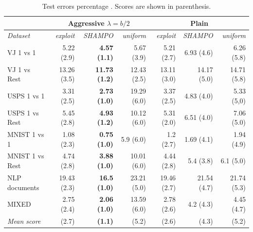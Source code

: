 \begin{table}[h] 
\begin{centering}
\caption{Test errors percentage . Scores are shown in parenthesis.}
\label{tab:table1}
{\scriptsize	
\begin{tabular}{|l|r|r|r|r|r|r|}
\hline
                         & \multicolumn{3}{c|}{\textbf{Aggressive $\lambda=b/2$}}               & \multicolumn{3}{c|}{\textbf{Plain}}                 \\ \hline
\textit{Dataset}         & \textit{exploit} & \textit{SHAMPO}         & \textit{uniform} & \textit{exploit} & \textit{SHAMPO} & \textit{uniform} \\ \hline
{VJ 1 vs 1 }        & 5.22 (2.9)       & \textbf{4.57 (1.1)}   & 5.67 (3.9)       & 5.21 (2.7)       & 6.93 (4.6)    & 6.26 (5.8)       \\
\textrm{VJ 1 vs Rest}    & 13.26 (3.5)      & \textbf{11.73 (1.2)} & 12.43 (2.5)      & 13.11 (3.0)        & 14.17 (5.0)     & 14.71 (5.8)     \\
\textrm{USPS 1 vs 1}      & 3.31 (2.5)       & \textbf{2.73 (1.0)}     & 19.29 (6.0)        & 3.37 (2.5)       & 4.83 (4.0)      & 5.33 (5,0)         \\
\textrm{USPS 1 vs Rest}  & 5.45 (2.8)      & \textbf{4.93 (1.2)}  & 10.12 (6.0)        & 5.31 (2.0)         & 6.51 (4.0)      & 7.06 (5.0)         \\
\textrm{MNIST 1 vs 1}     & 1.08 (2.3)       & \textbf{0.75 (1.0)}     & 5.9 (6.0)         & 1.2 (2.7)       & 1.69 (4.1)      & 1.94 (4.9)     \\
\textrm{MNIST 1 vs Rest} & 4.74 (2.8)      & \textbf{3.88 (1.0)}     & 10.01 (6.0)       & 4.44 (2.8)      & 5.4 (3.8)    & 6.1 (5.0)          \\
\textrm{NLP documents} & 19.43 (2.3)     & \textbf{16.5 (1.0)}     & 23.21 (5.0)        & 19.46 (2.7)     & 21.54 (4.7)  & 21.74 (5.3)     \\
\textrm{MIXED}           & 2.75 (2.4)       & \textbf{2.06 (1.0)}     & 13.59 (6.0)        & 2.78 (2.6)       & 4.2 (4.3)     & 4.45 (4.7)       \\ \hline
\textit{Mean score}      & (2.7)           & \textbf{(1.1)}       & (5.2)           & (2.6)           & (4.3)        & (5.2)           \\ \hline
\end{tabular}
}
\end{centering}
\vspace{-0.5cm}
\end{table}

